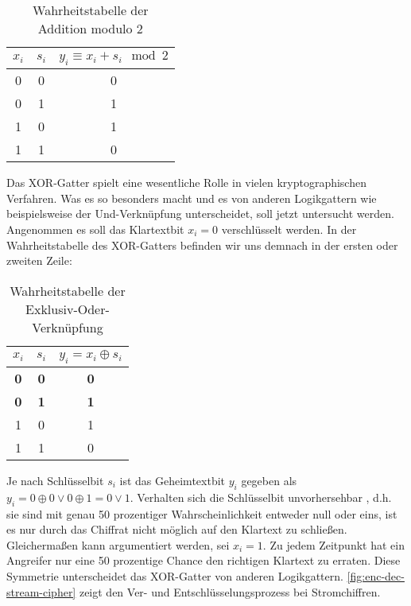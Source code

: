 \begin{table}[h]
  \centering
  \caption{Wahrheitstabelle der Addition modulo 2}
  \begin{tabular}{cc|c}
    $x_i$ & $s_i$ & $y_i \equiv x_i + s_i \mod{2}$ \\ \hline
    0     & 0     & 0                              \\
    0     & 1     & 1                              \\
    1     & 0     & 1                              \\
    1     & 1     & 0                              \\
  \end{tabular}
  \label{tab:truth-table-addition-mod-2}
\end{table}

\noindent
Das XOR-Gatter spielt eine wesentliche Rolle in vielen kryptographischen Verfahren.
Was es so besonders macht und es von anderen Logikgattern
wie beispielsweise der Und-Verknüpfung unterscheidet, soll jetzt untersucht werden.
Angenommen es soll das Klartextbit $x_i = 0$ verschlüsselt werden. In der Wahrheitstabelle
des XOR-Gatters befinden wir uns demnach in der ersten oder zweiten Zeile:

\begin{table}[h]
  \centering
  \caption{Wahrheitstabelle der Exklusiv-Oder-Verknüpfung}
  \begin{tabular}{cc|c}
    $x_i$      & $s_i$      & $y_i = x_i \oplus s_i$ \\ \hline
    \textbf{0} & \textbf{0} & \textbf{0}             \\
    \textbf{0} & \textbf{1} & \textbf{1}             \\
    1          & 0          & 1                      \\
    1          & 1          & 0                      \\
  \end{tabular}
  \label{tab:truth-table-xor}
\end{table}

\noindent
Je nach Schlüsselbit $s_i$ ist das Geheimtextbit $y_i$ gegeben als
$y_i = 0 \oplus 0 \vee 0 \oplus 1 = 0 \vee 1$.
Verhalten sich die Schlüsselbit unvorhersehbar , d.h. sie sind mit genau 50 prozentiger
Wahrscheinlichkeit entweder null oder eins, ist es nur durch das Chiffrat nicht möglich auf
den Klartext zu schließen. Gleichermaßen kann argumentiert werden, sei $x_i = 1$.
Zu jedem Zeitpunkt hat ein Angreifer nur eine 50 prozentige Chance den richtigen Klartext zu erraten.
Diese Symmetrie unterscheidet das XOR-Gatter von anderen Logikgattern.
\autoref{fig:enc-dec-stream-cipher} zeigt den Ver- und Entschlüsselungsprozess
bei Stromchiffren.
\newpage

